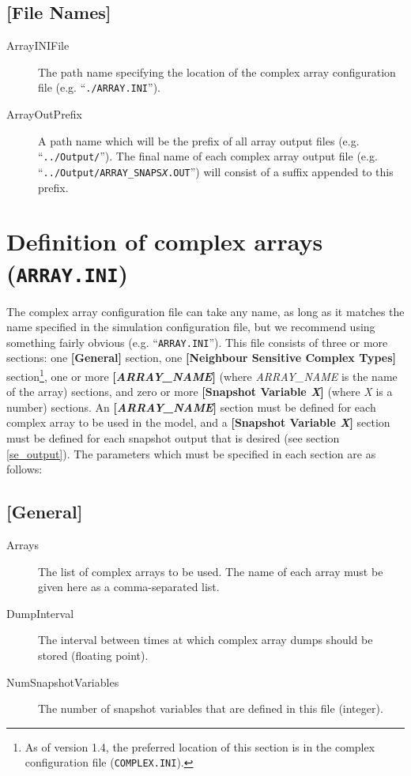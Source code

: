 \subsection{[File Names]}
\begin{description}
\item[ArrayINIFile] The path name specifying the location of the
  complex array configuration file (e.g. ``\texttt{./ARRAY.INI}'').
  
\item[ArrayOutPrefix] A path name which will be the prefix of all
  array output files (e.g. ``\texttt{../Output/}'').  The final name
  of each complex array output file (e.g. \\
  ``\texttt{../Output/ARRAY\_SNAPS\emph{X}.OUT}'') will consist of a suffix
  appended to this prefix.
\end{description}



\section{Definition of complex arrays (\texttt{ARRAY.INI})}\label{array_ini}

The complex array configuration file can take any name, as long as it
matches the name specified in the simulation configuration file, but
we recommend using something fairly obvious (e.g.
``\texttt{ARRAY.INI}'').  This file consists of three or more
sections: one \textbf{[General]} section, one \textbf{[Neighbour
  Sensitive Complex Types]} section\footnote{As of version 1.4, the
  preferred location of this section is in the complex configuration
  file (\texttt{COMPLEX.INI}).}, one or more
\textbf{[\emph{ARRAY\_NAME}]} (where \emph{ARRAY\_NAME} is the name of
the array) sections, and zero or more \textbf{[Snapshot Variable
  \emph{X}]} (where \emph{X} is a number) sections.  An
\textbf{[\emph{ARRAY\_NAME}]} section must be defined for each complex
array to be used in the model, and a \textbf{[Snapshot Variable
  \emph{X}]} section must be defined for each snapshot output that is
desired (see section \ref{se_output}). The parameters which must be
specified in each section are as follows:

\subsection{[General]}
\begin{description}
\item[Arrays] The list of complex arrays to be used.  The name of each
  array must be given here as a comma-separated list.
  
\item[DumpInterval] The interval between times at which complex array
  dumps should be stored (floating point).

\item[NumSnapshotVariables] The number of snapshot variables that are
  defined in this file (integer).
\end{description}

